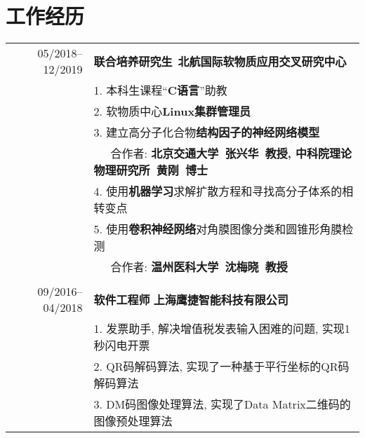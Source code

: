 \documentclass[a4paper,10pt]{article} %
\begin{document}
\section{工作经历}
\begin{tabular}{r|p{11cm}}
	05/2018--12/2019            & \textbf{联合培养研究生}\ \textbf{北航国际软物质应用交叉研究中心}  \\
	& 1. 本科生课程“\textbf{C语言}”助教 \\
	& 2. 软物质中心\textbf{Linux集群管理员}\\
	& 3. 建立高分子化合物\textbf{结构因子的神经网络模型}\\ &\ \ \ 合作者: \textbf{北京交通大学\ 张兴华\ 教授, 中科院理论物理研究所\ 黄刚\ 博士} \\
	& 4. 使用\textbf{机器学习}求解扩散方程和寻找高分子体系的相转变点\\
	& 5. 使用\textbf{卷积神经网络}对角膜图像分类和圆锥形角膜检测\\ & \ \ \ 合作者: \textbf{温州医科大学\ 沈梅晓\ 教授}\\
	\multicolumn{2}{c}{} \\	%
	09/2016--04/2018            & \textbf{软件工程师}  \textbf{上海鹰捷智能科技有限公司} \\                          & 1. 发票助手, 解决增值税发表输入困难的问题, 实现1秒闪电开票\\
	& 2. QR码解码算法, 实现了一种基于平行坐标的QR码解码算法\\
	
	& 3. DM码图像处理算法, 实现了Data Matrix二维码的图像预处理算法\\
\end{tabular}
\end{document}
